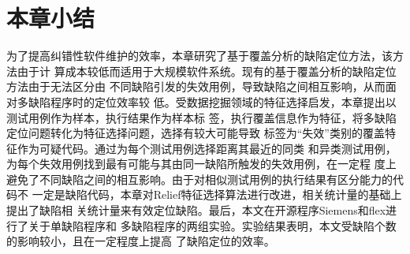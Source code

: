 \section{本章小结}
为了提高纠错性软件维护的效率，本章研究了基于覆盖分析的缺陷定位方法，该方法由于计
算成本较低而适用于大规模软件系统。现有的基于覆盖分析的缺陷定位方法由于无法区分由
不同缺陷引发的失效用例，导致缺陷之间相互影响，从而面对多缺陷程序时的定位效率较
低。受数据挖掘领域的特征选择启发，本章提出以测试用例作为样本，执行结果作为样本标
签，执行覆盖信息作为特征，将多缺陷定位问题转化为特征选择问题，选择有较大可能导致
标签为``失效''类别的覆盖特征作为可疑代码。通过为每个测试用例选择距离其最近的同类
和异类测试用例，为每个失效用例找到最有可能与其由同一缺陷所触发的失效用例，在一定程
度上避免了不同缺陷之间的相互影响。由于对相似测试用例的执行结果有区分能力的代码不
一定是缺陷代码，本章对Relief特征选择算法进行改进，相关统计量的基础上提出了缺陷相
关统计量来有效定位缺陷。最后，本文在开源程序Siemens和flex进行了关于单缺陷程序和
多缺陷程序的两组实验。实验结果表明，本文受缺陷个数的影响较小，且在一定程度上提高
了缺陷定位的效率。




